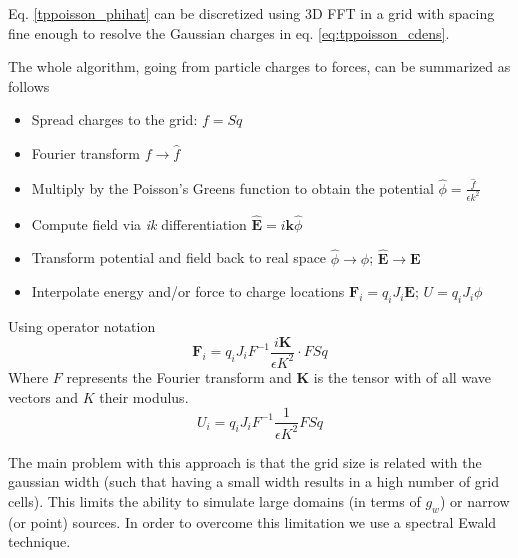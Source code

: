 \documentclass[ twoside,openright,titlepage,numbers=noenddot,%
headinclude,footinclude,cleardoublepage=empty,abstract=on,
BCOR=5mm,paper=a4,fontsize=11pt
]{scrreprt}
\renewcommand{\vec}[1]{\bm{#1}}
\begin{document}
Eq. \eqref{tppoisson_phihat} can be discretized using 3D \gls{FFT} in a grid with spacing fine enough to resolve the Gaussian charges in eq. \eqref{eq:tppoisson_cdens}.

The whole algorithm, going from particle charges to forces, can be summarized as follows
\begin{itemize}
\item Spread charges to the grid: $f=Sq$
\item Fourier transform $f\rightarrow \hat{f}$
\item Multiply by the Poisson's Greens function to obtain the potential $\hat{\phi}=\frac{\hat{f}}{\epsilon k^2}$
\item Compute field via \emph{ik} differentiation $\hat{\vec{E}} = i\vec{k}\hat{\phi}$
\item Transform potential and field back to real space $\hat{\phi} \rightarrow \phi$; $\hat{\vec{E}} \rightarrow \vec{E}$
\item Interpolate energy and/or force to charge locations $\vec{F}_i = q_iJ_i\vec{E}$; $U = q_iJ_i\phi$
\end{itemize}
Using operator notation
\begin{equation}
  \label{eq:tppoison_alg}
  \vec{F}_i = q_iJ_iF^{-1} \frac{i\vec{K}}{\epsilon K^2} \cdot F Sq
\end{equation}
Where $F$ represents the Fourier transform and $\vec{K}$ is the tensor with of all wave vectors and $K$ their modulus.
\begin{equation}
  \label{eq:tppoison_alg_u}
  U_i = q_iJ_iF^{-1} \frac{1}{\epsilon K^2}F Sq
\end{equation}


The main problem with this approach is that the grid size is related with the gaussian width (such that having a small width results in a high number of grid cells). This limits the ability to simulate large domains (in terms of $g_w$) or narrow (or point) sources. In order to overcome this limitation we use a spectral Ewald technique.
\end{document}
